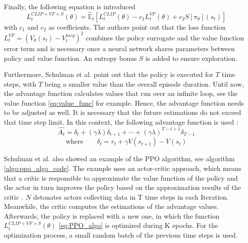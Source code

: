 Finally, the following equation is introduced
\begin{equation}\label{eq:PPO_algo}
    L_{t}^{CLIP+VF+S}(\theta) = \hat{\mathbb{E}}_{t} \left[ L_{t}^{CLIP}(\theta) - c_{1}L_{t}^{VF}(\theta) + c_{2}S[\pi_{\theta}](s_{t}) \right]
\end{equation}
with $c_{1}$ and $c_{2}$ as coefficients. The authors point out that the loss function \\
$L_{t}^{VF} = (V_{\theta}(s_{t})-V_{t}^{targ})^2$ combines the policy surrogate and the value function error term and is necessary once a neural network shares parameters between policy and value function. An entropy bonus $S$ is added to ensure exploration.

Furthermore, Schulman et al. point out that the policy is executed for $T$ time steps, with $T$ being a smaller value than the overall episode duration. Until now, the advantage function calculates values that run over an infinite loop, see the value function \eqref{eq:value_func} for example. Hence, the advantage function needs to be adjusted as well. It is necessary that the future estimations do not exceed that time step limit. In this context, the following advantage function is used \cite{scwo17}:
\begin{equation}\label{eq:advantage_func}
    \hat{A_t} = \delta_t+(\gamma \lambda)\delta_{t+1}+ \cdots + (\gamma \lambda)^{T-t+1}\delta_{T-1}
\end{equation}
\begin{equation}\label{eq:advantage_func_delta}
    \textrm{where} \qquad \delta_t = r_t + \gamma V(s_{t+1}) - V(s_t)
\end{equation}

Schulman et al. also showed an example of the PPO algorithm, see algorithm \ref{algo:ppo_algo_code}. The example uses an actor-critic approach, which means that a critic is responsible to approximate the value function of the policy and the actor in turn improves the policy based on the approximation results of the critic \cite{kots03}. $N$ detonates actors collecting data in T time steps in each Iteration. Meanwhile, the critic computes the estimations of the advantage values. Afterwards, the policy is replaced with a new one, in which the function $L_{t}^{CLIP+VF+S}(\theta)$ \eqref{eq:PPO_algo} is optimized during K epochs. For the optimization process, a small random batch of the previous time steps is used.

